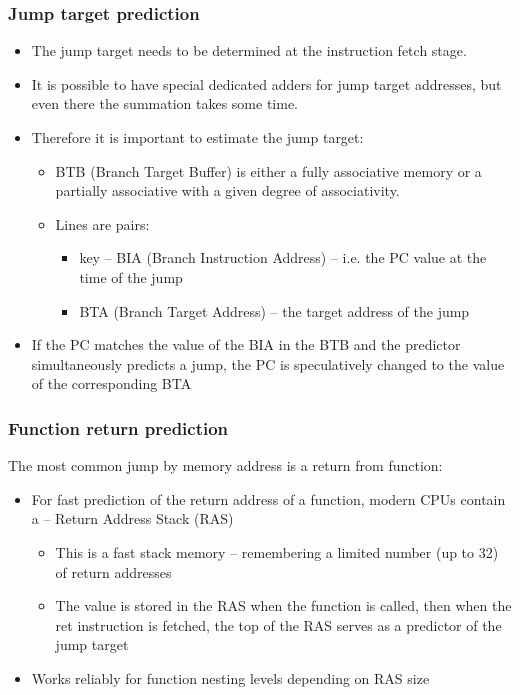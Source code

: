 \documentclass{beamer}
\begin{document}
\begin{frame}
\frametitle{Jump target prediction}

\begin{itemize}
\item The jump target needs to be determined at the instruction fetch stage.
\item It is possible to have special dedicated adders for jump target addresses, but even there the summation takes some time.
\item Therefore it is important to estimate the jump target:
\begin{itemize}
\item BTB (Branch Target Buffer) is either a fully associative memory or a partially
associative with a given degree of associativity.
\item Lines are pairs:
\begin{itemize}
\item key -- BIA (Branch Instruction Address) -- i.e. the PC value at the time of the jump
\item BTA (Branch Target Address) -- the target address of the jump
\end{itemize}
\end{itemize}
\item If the PC matches the value of the BIA in the BTB and the predictor simultaneously predicts a jump, the PC is speculatively changed to the value of the corresponding BTA
\end{itemize}
\end{frame}

\begin{frame}
\frametitle{Function return prediction}

The most common jump by memory address is a return from function:
\begin{itemize}
\item For fast prediction of the return address of a function, modern CPUs contain a -- Return Address Stack (RAS)
\begin{itemize}
\item This is a fast stack memory -- remembering a limited number (up to 32) of return addresses
\item The value is stored in the RAS when the function is called, then when the ret instruction is fetched, the top of the RAS serves as a predictor of the jump target
\end{itemize}
\item Works reliably for function nesting levels depending on RAS size
\end{itemize}
\end{frame}
\end{document}
